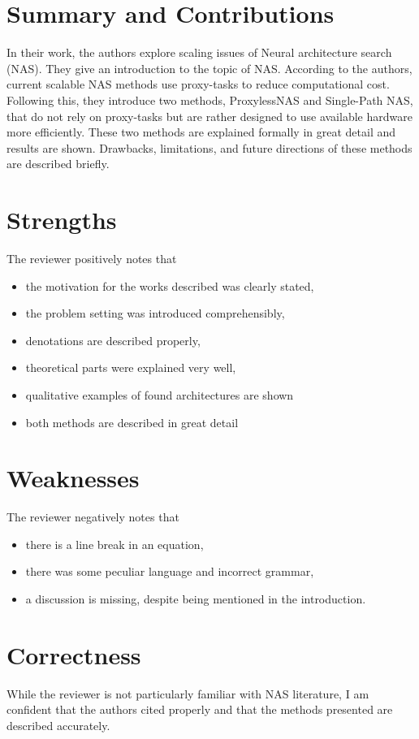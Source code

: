 \documentclass[a4paper]{scrartcl}
\begin{document}
	
\section*{Summary and Contributions}
In their work, the authors explore scaling issues of Neural architecture search (NAS). They give an introduction to the topic of NAS. According to the authors, current scalable NAS methods use proxy-tasks to reduce computational cost. Following this, they introduce two methods, ProxylessNAS and Single-Path NAS, that do not rely on proxy-tasks but are rather designed to use available hardware more efficiently. These two methods are explained formally in great detail and results are shown. Drawbacks, limitations, and future directions of these methods are described briefly.


\section*{Strengths}
The reviewer positively notes that
\begin{itemize}
	\item the motivation for the works described was clearly stated,
	\item the problem setting was introduced comprehensibly,
	\item denotations are described properly,
	\item theoretical parts were explained very well,
	\item qualitative examples of found architectures are shown
	\item both methods are described in great detail
\end{itemize}


\section*{Weaknesses}
The reviewer negatively notes that
\begin{itemize}
	\item there is a line break in an equation,
	\item there was some peculiar language and incorrect grammar,
	\item a discussion is missing, despite being mentioned in the introduction.
\end{itemize}




\section*{Correctness}
While the reviewer is not particularly familiar with NAS literature, I am confident that the authors cited properly and that the methods presented are described accurately.
\end{document}
